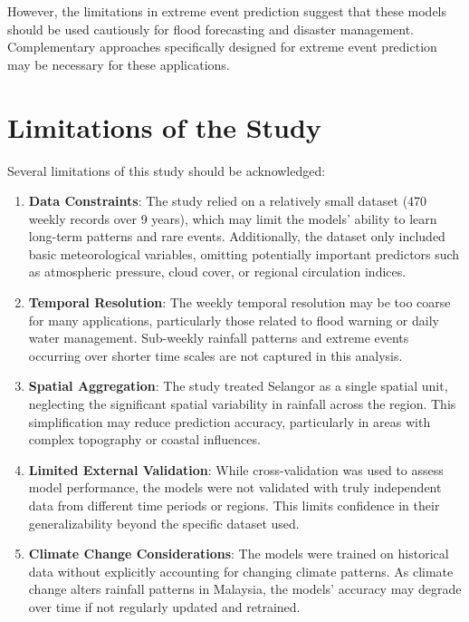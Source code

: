 \documentclass[12pt]{article}
\begin{document}
However, the limitations in extreme event prediction suggest that these models should be used cautiously for flood forecasting and disaster management. Complementary approaches specifically designed for extreme event prediction may be necessary for these applications.

\section{Limitations of the Study}
\label{sec:study_limitations}

Several limitations of this study should be acknowledged:

\begin{enumerate}
    \item \textbf{Data Constraints}: The study relied on a relatively small dataset (470 weekly records over 9 years), which may limit the models' ability to learn long-term patterns and rare events. Additionally, the dataset only included basic meteorological variables, omitting potentially important predictors such as atmospheric pressure, cloud cover, or regional circulation indices.
    
    \item \textbf{Temporal Resolution}: The weekly temporal resolution may be too coarse for many applications, particularly those related to flood warning or daily water management. Sub-weekly rainfall patterns and extreme events occurring over shorter time scales are not captured in this analysis.
    
    \item \textbf{Spatial Aggregation}: The study treated Selangor as a single spatial unit, neglecting the significant spatial variability in rainfall across the region. This simplification may reduce prediction accuracy, particularly in areas with complex topography or coastal influences.
    
    \item \textbf{Limited External Validation}: While cross-validation was used to assess model performance, the models were not validated with truly independent data from different time periods or regions. This limits confidence in their generalizability beyond the specific dataset used.
    
    \item \textbf{Climate Change Considerations}: The models were trained on historical data without explicitly accounting for changing climate patterns. As climate change alters rainfall patterns in Malaysia, the models' accuracy may degrade over time if not regularly updated and retrained.
\end{enumerate}
\end{document}
